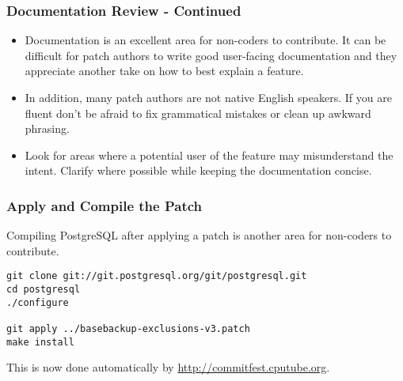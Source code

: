 \begin{frame}[fragile]
    \frametitle{Documentation Review - Continued}

    \begin{itemize}
        \item Documentation is an excellent area for non-coders to contribute.  It can be difficult for patch authors to write good user-facing documentation and they appreciate another take on how to best explain a feature.\pause

        \item In addition, many patch authors are not native English speakers.  If you are fluent don't be afraid to fix grammatical mistakes or clean up awkward phrasing.\pause

        \item Look for areas where a potential user of the feature may misunderstand the intent.  Clarify where possible while keeping the documentation concise.
    \end{itemize}
\end{frame}

\begin{frame}[fragile]
    \frametitle{Apply and Compile the Patch}

    Compiling PostgreSQL after applying a patch is another area for non-coders to contribute.
    \vspace{1em}

    \begin{lstlisting}
git clone git://git.postgresql.org/git/postgresql.git
cd postgresql
./configure

git apply ../basebackup-exclusions-v3.patch
make install
    \end{lstlisting}

    \vspace{1em}
    This is now done automatically by \url{http://commitfest.cputube.org}.
\end{frame}

